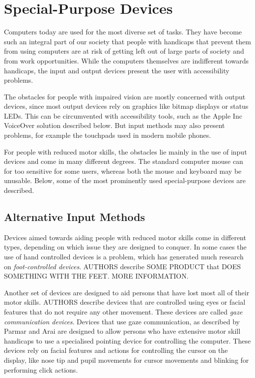 \section{Special-Purpose Devices}

Computers today are used for the most diverse set of tasks. They have become such an integral part of our society that people with handicaps that prevent them from using computers are at risk of getting left out of large parts of society and from work opportunities. While the computers themselves are indifferent towards handicaps, the input and output devices present the user with accessibility problems.

The obstacles for people with impaired vision are mostly concerned with output devices, since most output devices rely on graphics like bitmap displays or status LEDs. This can be circumvented with accessibility tools, such as the Apple Inc VoiceOver solution described below. But input methods may also present problems, for example the touchpads used in modern mobile phones.

For people with reduced motor skills, the obstacles lie mainly in the use of input devices and come in many different degrees. The standard computer mouse  can for too sensitive for some users, whereas both the mouse and keyboard may be unusable. Below, some of the most prominently used special-purpose devices are described.

\subsection{Alternative Input Methods}
Devices aimed towards aiding people with reduced motor skills come in different types, depending on which issue they are designed to conquer. In some cases the use of hand controlled devices is a problem, which has generated much research on \emph{foot-controlled devices}. AUTHORS describe SOME PRODUCT that DOES SOMETHING WITH THE FEET. MORE INFORMATION.


Another set of devices are designed to aid persons that have lost most all of their motor skills. AUTHORS describe devices that are controlled using eyes or facial features that do not require any other movement. These devices are called \emph{gaze communication devices}. Devices that use gaze communication, as described by Parmar\cite{ieee6398171} and Arai\cite{conf/itng/AraiM11a} are designed to allow persons who have extensive motor skill handicaps to use a specialised pointing device for controlling the computer. These devices rely on facial features and actions for controlling the cursor on the display, like nose tip and pupil movements for cursor movements and blinking for performing click actions.

